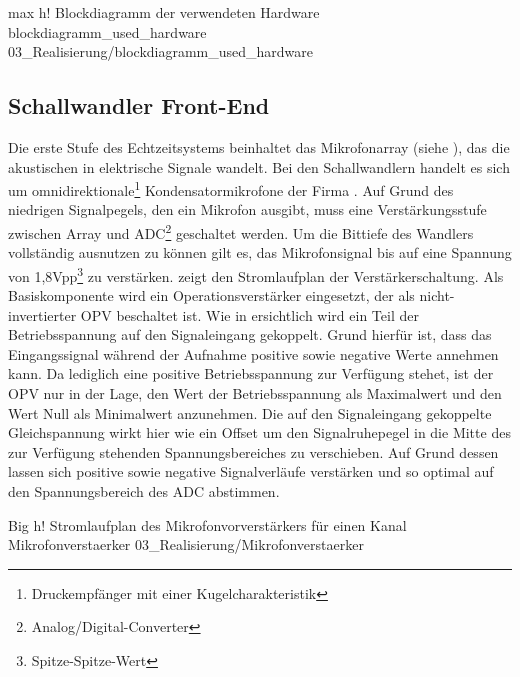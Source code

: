          {max}                                                       %
         {h!}                                                  %
         {Blockdiagramm der verwendeten Hardware}    %
         {blockdiagramm_used_hardware}                                               %
         {03_Realisierung/blockdiagramm_used_hardware} 


\subsection{Schallwandler Front-End}
\label{subsec:SchallwandlerFrontEnd}
Die erste Stufe des Echtzeitsystems beinhaltet das Mikrofonarray (siehe ), das die akustischen in elektrische Signale wandelt. Bei den Schallwandlern handelt es sich um omnidirektionale\footnote{Druckempfänger mit einer Kugelcharakteristik} Kondensatormikrofone der Firma \sennheiser. Auf Grund des niedrigen Signalpegels, den ein Mikrofon ausgibt, muss eine Verstärkungsstufe zwischen Array und ADC\footnote{Analog/Digital-Converter} geschaltet werden. Um die Bittiefe des Wandlers vollständig ausnutzen zu können gilt es, das Mikrofonsignal bis auf eine Spannung von 1,8Vpp\footnote{Spitze-Spitze-Wert} zu verstärken.  zeigt den Stromlaufplan der Verstärkerschaltung. Als Basiskomponente wird ein Operationsverstärker eingesetzt, der als nicht-invertierter OPV beschaltet ist. Wie in  ersichtlich wird ein Teil der Betriebsspannung auf den Signaleingang gekoppelt. Grund hierfür ist, dass das Eingangssignal während der Aufnahme positive sowie negative Werte annehmen kann. Da lediglich eine positive Betriebsspannung zur Verfügung stehet, ist der OPV nur in der Lage, den Wert der Betriebsspannung als Maximalwert und den Wert Null als Minimalwert anzunehmen. Die auf den Signaleingang gekoppelte Gleichspannung wirkt hier wie ein Offset um den Signalruhepegel in die Mitte des zur Verfügung stehenden Spannungsbereiches zu verschieben. Auf Grund dessen lassen sich positive sowie negative Signalverläufe verstärken und so optimal auf den Spannungsbereich des ADC abstimmen.

         {Big}                                                       %
         {h!}                                                  %
         {Stromlaufplan des Mikrofonvorverstärkers für einen Kanal}    %
         {Mikrofonverstaerker}                                               %
         {03_Realisierung/Mikrofonverstaerker} 


